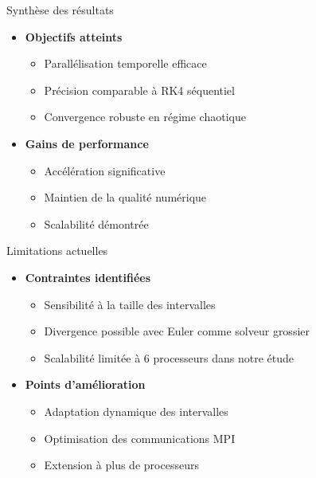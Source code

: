 
\begin{frame}{Synthèse des résultats}
    \begin{itemize}
        \item \textbf{Objectifs atteints}
        \begin{itemize}
            \item Parallélisation temporelle efficace
            \item Précision comparable à RK4 séquentiel
            \item Convergence robuste en régime chaotique
        \end{itemize}
        \vspace{0.3cm}
        \item \textbf{Gains de performance}
        \begin{itemize}
            \item Accélération significative
            \item Maintien de la qualité numérique
            \item Scalabilité démontrée
        \end{itemize}
    \end{itemize}
\end{frame}

\begin{frame}{Limitations actuelles}
    \begin{itemize}
        \item \textbf{Contraintes identifiées}
        \begin{itemize}
            \item Sensibilité à la taille des intervalles
            \item Divergence possible avec Euler comme solveur grossier
            \item Scalabilité limitée à 6 processeurs dans notre étude
        \end{itemize}
        \vspace{0.3cm}
        \item \textbf{Points d'amélioration}
        \begin{itemize}
            \item Adaptation dynamique des intervalles
            \item Optimisation des communications MPI
            \item Extension à plus de processeurs
        \end{itemize}
    \end{itemize}
\end{frame}

